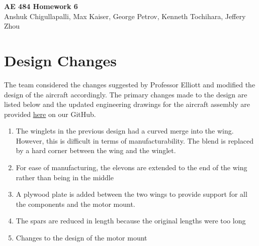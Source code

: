 




\begin{center}
    {\Large\textbf{AE 484 Homework 6}}\\
    Anshuk Chigullapalli, Max Kaiser, George Petrov, Kenneth Tochihara, Jeffery Zhou\\
\end{center}

\section{Design Changes}

    The team considered the changes suggested by Professor Elliott and modified the design of the aircraft accordingly. The primary changes made to the design are listed below and the updated engineering drawings for the aircraft assembly are provided  \href{https://github.com/ktt3/ae484/tree/main/homeworks/homework6/drawing}{here} on our GitHub.
    
    \begin{enumerate}
        \item The winglets in the previous design had a curved merge into the wing. However, this is difficult in terms of manufacturability. The blend is replaced by a hard corner between the wing and the winglet.
        \item For ease of manufacturing, the elevons are extended to the end of the wing rather than being in the middle
        \item A plywood plate is added between the two wings to provide support for all the components and the motor mount.
        \item The spars are reduced in length because the original lengths were too long
        \item Changes to the design of the motor mount
    \end{enumerate}
    
